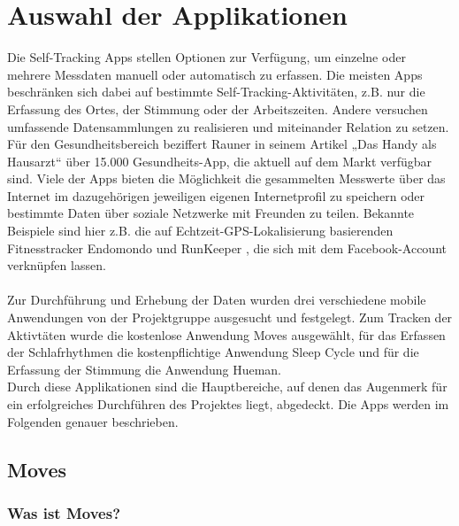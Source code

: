 
\chapter{Auswahl der Applikationen}
\label{ch:Apps}

Die Self-Tracking Apps stellen Optionen zur Verfügung, um einzelne oder mehrere Messdaten manuell oder automatisch zu erfassen. 
Die meisten Apps beschränken sich dabei auf bestimmte Self-Tracking-Aktivitäten, z.B. nur die Erfassung des Ortes, der Stimmung oder der Arbeitszeiten.
Andere versuchen umfassende Datensammlungen zu realisieren und miteinander Relation zu setzen. \\
Für den Gesundheitsbereich beziffert Rauner in seinem Artikel „Das Handy als Hausarzt“ \cite{web:Selbstvermesser} über 15.000 Gesundheits-App, die aktuell auf dem Markt verfügbar sind.
Viele der Apps bieten die Möglichkeit die gesammelten Messwerte über das Internet im dazugehörigen jeweiligen eigenen Internetprofil zu speichern oder bestimmte Daten über soziale Netzwerke mit Freunden zu teilen. 
Bekannte Beispiele sind hier z.B. die auf Echtzeit-GPS-Lokalisierung basierenden Fitnesstracker Endomondo \cite{web:Endomondo} und RunKeeper \cite{web:RunKeeper}, die sich mit dem Facebook-Account verknüpfen lassen. 
\\
\\
Zur Durchführung und Erhebung der Daten wurden drei verschiedene mobile Anwendungen von der Projektgruppe ausgesucht und festgelegt.
Zum Tracken der Aktivtäten wurde die kostenlose Anwendung Moves ausgewählt, für das Erfassen der Schlafrhythmen die kostenpflichtige Anwendung Sleep Cycle und für die Erfassung der Stimmung die Anwendung Hueman.\\
Durch diese Applikationen sind die Hauptbereiche, auf denen das Augenmerk für ein erfolgreiches Durchführen des Projektes liegt, abgedeckt.
Die Apps werden im Folgenden genauer beschrieben.


\section{Moves}
\label{ch:Apps:sec:Moves}

\subsection{Was ist Moves?}
\label{ch:Apps:sec:Moves:subsec:WIM}

